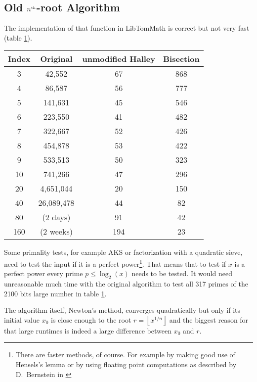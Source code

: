 \documentclass[a4paper,10pt]{report}
\providecommand{\floor}[1]{\left\lfloor#1\right\rfloor}
\newcommand{\nthroot}{$n^{\text{\tiny th}}$-root}
\theoremstyle{plain} %
\theoremstyle{definition}
\theoremstyle{remark}
\begin{document}
\subsection{Old \nthroot{} Algorithm}
The implementation of that function in LibTomMath\cite{denislibtommath} is correct but not very fast (table \ref{tab:oldtohalleybisec}).
\begin{table}[h]
\begin{center}
\begin{tabular}{c c c c }
\textbf{Index}&\textbf{Original}&\textbf{unmodified Halley}&\textbf{Bisection}\\\hline
3 & 42,552 &  67 & 868\\
4 & 86,587 &  56 & 777\\
5 & 141,631 & 45 & 546\\
6 & 223,550 & 41 & 482\\
7 & 322,667 & 52 & 426\\
8 & 454,878 & 53 & 422\\
9 & 533,513  & 50 & 323\\
10 & 741,266 & 47 & 296\\
20 & 4,651,044 & 20 & 150\\
40 & 26,089,478 & 44 & 82 \\
80 & (2 days) & 91 & 42 \\
160 & (2 weeks) & 194& 23
\end{tabular}
\label{tab:oldtohalleybisec}
\end{center}
\end{table}
Some primality tests, for example AKS\cite{agrawal2004primes,lenstra2002primality,bernstein2003proving} or factorization with a quadratic sieve, need to test the input if it is a perfect power\footnote{There are faster methods, of course. For example by making good use of Hensels's lemma\cite{hensel1908theorie} or by using floating point computations as described by D.~Bernstein in \cite{bernstein1998detecting}}. That means that to test if $x$ is a perfect power every prime $p \leq \log_2(x)$ needs to be tested. It would need unreasonable much time with the original algorithm to test all 317 primes of the 2100 bits large number in table \ref{tab:oldtohalleybisec}.

The algorithm itself, Newton's method, converges quadratically but only if its initial value $x_0$ is close enough to the root $r= \floor{x^{1/n}}$ and the biggest reason for that large runtimes is indeed a large difference between $x_0$ and $r$.
\end{document}
